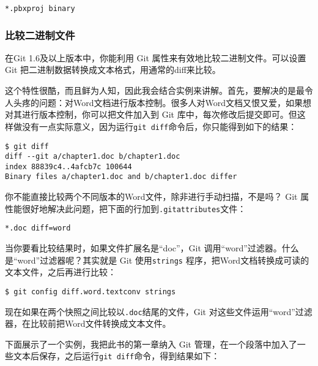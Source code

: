 \documentclass[a4paper]{book}
\begin{document}
\begin{shaded}\begin{verbatim}
*.pbxproj binary
\end{verbatim}\end{shaded}

\subsubsection{比较二进制文件}

在Git 1.6及以上版本中，你能利用 Git 属性来有效地比较二进制文件。可以设置 Git 把二进制数据转换成文本格式，用通常的diff来比较。

这个特性很酷，而且鲜为人知，因此我会结合实例来讲解。首先，要解决的是最令人头疼的问题：对Word文档进行版本控制。很多人对Word文档又恨又爱，如果想对其进行版本控制，你可以把文件加入到 Git 库中，每次修改后提交即可。但这样做没有一点实际意义，因为运行\texttt{git diff}命令后，你只能得到如下的结果：

\begin{shaded}\begin{verbatim}
$ git diff
diff --git a/chapter1.doc b/chapter1.doc
index 88839c4..4afcb7c 100644
Binary files a/chapter1.doc and b/chapter1.doc differ
\end{verbatim}\end{shaded}

你不能直接比较两个不同版本的Word文件，除非进行手动扫描，不是吗？ Git 属性能很好地解决此问题，把下面的行加到\texttt{.gitattributes}文件：

\begin{shaded}\begin{verbatim}
*.doc diff=word
\end{verbatim}\end{shaded}

当你要看比较结果时，如果文件扩展名是“doc”，Git 调用“word”过滤器。什么是“word”过滤器呢？其实就是 Git 使用\texttt{strings} 程序，把Word文档转换成可读的文本文件，之后再进行比较：

\begin{shaded}\begin{verbatim}
$ git config diff.word.textconv strings
\end{verbatim}\end{shaded}

现在如果在两个快照之间比较以\texttt{.doc}结尾的文件，Git 对这些文件运用“word”过滤器，在比较前把Word文件转换成文本文件。

下面展示了一个实例，我把此书的第一章纳入 Git 管理，在一个段落中加入了一些文本后保存，之后运行\texttt{git diff}命令，得到结果如下：
\end{document}
